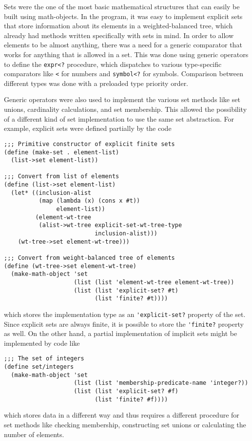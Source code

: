 \documentclass{article}
\begin{document}
            Sets were the one of the most basic mathematical structures that can easily be built using math-objects. In the program, it was easy to implement explicit sets that store information about its elements in a weighted-balanced tree, which already had methods written specifically with sets in mind. In order to allow elements to be almost anything, there was a need for a generic comparator that works for anything that is allowed in a set. This was done using generic operators to define the \verb+expr<?+ procedure, which dispatches to various type-specific comparators like \verb+<+ for numbers and \verb+symbol<?+ for symbols. Comparison between different types was done with a preloaded type priority order.
            
            Generic operators were also used to implement the various set methods like set unions, cardinality calculations, and set membership. This allowed the possibility of a different kind of set implementation to use the same set abstraction. For example, explicit sets were defined partially by the code
\begin{verbatim}
;;; Primitive constructor of explicit finite sets
(define (make-set . element-list)
  (list->set element-list))

;;; Convert from list of elements
(define (list->set element-list)
  (let* ((inclusion-alist
          (map (lambda (x) (cons x #t))
               element-list))
         (element-wt-tree
          (alist->wt-tree explicit-set-wt-tree-type
                          inclusion-alist)))
    (wt-tree->set element-wt-tree)))

;;; Convert from weight-balanced tree of elements
(define (wt-tree->set element-wt-tree)
  (make-math-object 'set
                    (list (list 'element-wt-tree element-wt-tree))
                    (list (list 'explicit-set? #t)
                          (list 'finite? #t))))
\end{verbatim}
            which stores the implementation type as an \verb+'explicit-set?+ property of the set. Since explicit sets are always finite, it is possible to store the \verb+'finite?+ property as well. On the other hand, a partial implementation of implicit sets might be implemented by code like
\begin{verbatim}
;;; The set of integers
(define set/integers
  (make-math-object 'set
                    (list (list 'membership-predicate-name 'integer?))
                    (list (list 'explicit-set? #f)
                          (list 'finite? #f))))
\end{verbatim}
            which stores data in a different way and thus requires a different procedure for set methods like checking membership, constructing set unions or calculating the number of elements.
        
\end{document}
